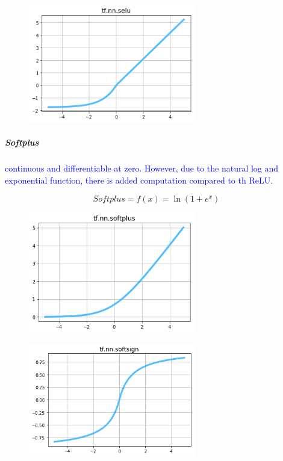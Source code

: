 \begin{figure}
	\centering
	\includegraphics[width=0.65\textwidth]{./sync_imgs/act/smooth/selu.png}
	\label{fig:act_smooth_selu}
\end{figure}


\subparagraph{Softplus}

\textcolor{blue}{continuous and differentiable at zero. However, due to the natural log and exponential function, there is added computation compared to th ReLU.}


\begin{equation}
{
	Softplus = f(x) = \ln{(1+e^x)}
}
\label{eq:act_softplus_def}
\end{equation}


\begin{figure}
	\centering
	\includegraphics[width=0.65\textwidth]{./sync_imgs/act/smooth/softplus.png}
	\label{fig:act_smooth_softplus}
\end{figure}

\begin{figure}
	\centering
	\includegraphics[width=0.65\textwidth]{./sync_imgs/act/smooth/softsign.png}
	\label{fig:act_smooth_softsign}
\end{figure}


